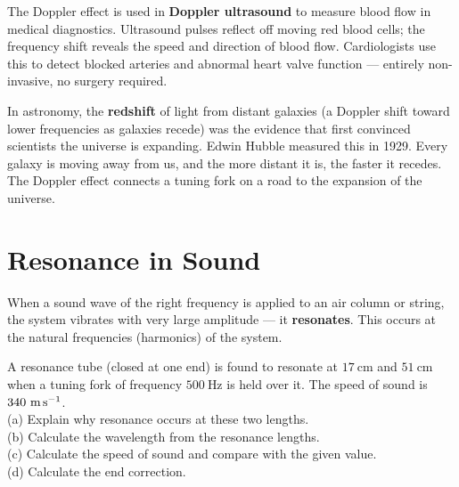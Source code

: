 \begin{realworldbox}
The Doppler effect is used in \textbf{Doppler
ultrasound} to measure blood flow in medical
diagnostics. Ultrasound pulses reflect off moving
red blood cells; the frequency shift reveals the
speed and direction of blood flow. Cardiologists use
this to detect blocked arteries and abnormal heart
valve function --- entirely non-invasive, no surgery
required.

In astronomy, the \textbf{redshift} of light from
distant galaxies (a Doppler shift toward lower
frequencies as galaxies recede) was the evidence
that first convinced scientists the universe is
expanding. Edwin Hubble measured this in 1929. Every
galaxy is moving away from us, and the more distant
it is, the faster it recedes. The Doppler effect
connects a tuning fork on a road to the expansion
of the universe.
\end{realworldbox}

\section{Resonance in Sound}

When a sound wave of the right frequency is applied to
an air column or string, the system vibrates with very
large amplitude --- it \textbf{resonates}. This occurs
at the natural frequencies (harmonics) of the system.

\begin{examplebox}[18.5]
A resonance tube (closed at one end) is found to
resonate at $17\ \text{cm}$ and $51\ \text{cm}$
when a tuning fork of frequency $500\ \text{Hz}$
is held over it. The speed of sound is
$340\ \text{m\,s}^{-1}$.\\
(a) Explain why resonance occurs at these two lengths.\\
(b) Calculate the wavelength from the resonance
lengths.\\
(c) Calculate the speed of sound and compare with
the given value.\\
(d) Calculate the end correction.
\end{examplebox}

